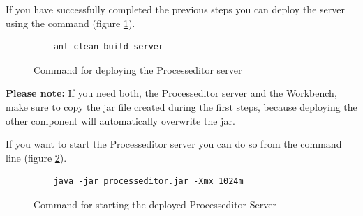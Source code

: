 If you have successfully completed the previous steps you can deploy the server using the command (figure \ref{lis:deps}).

\begin{figure}[h!]
\begin{verbatim}
	ant clean-build-server
\end{verbatim}
\caption{Command for deploying the Processeditor server}
\label{lis:deps}
\end{figure}

\begin{leftbar}
\textbf{
Please note:} If you need both, the Processeditor server and the Workbench, make sure to copy the jar file created during the first steps, because deploying the other component will automatically overwrite the jar.
\end{leftbar}

If you want to start the Processeditor server you can do so from the command line (figure \ref{lis:startserver}).

\begin{figure}[h!]
\begin{verbatim}
	java -jar processeditor.jar -Xmx 1024m
\end{verbatim}
\caption{Command for starting the deployed Processeditor Server}
\label{lis:startserver}
\end{figure}
